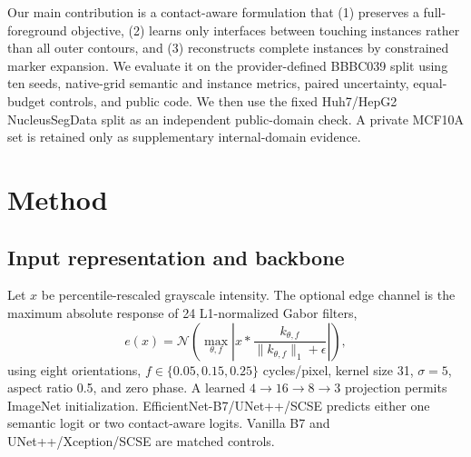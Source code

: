 \documentclass{article}
\begin{document}
Our main contribution is a contact-aware formulation that (1) preserves a full-foreground objective, (2) learns only interfaces between touching instances rather than all outer contours, and (3) reconstructs complete instances by constrained marker expansion. We evaluate it on the provider-defined BBBC039 split using ten seeds, native-grid semantic and instance metrics, paired uncertainty, equal-budget controls, and public code. We then use the fixed Huh7/HepG2 NucleusSegData split as an independent public-domain check. A private MCF10A set is retained only as supplementary internal-domain evidence.

\section{Method}
\subsection{Input representation and backbone}
Let $x$ be percentile-rescaled grayscale intensity. The optional edge channel is the maximum absolute response of 24 L1-normalized Gabor filters,
\begin{equation}
e(x)=\mathcal N\!\left(\max_{\theta,f}\left|x*\frac{k_{\theta,f}}{\lVert k_{\theta,f}\rVert_1+\epsilon}\right|\right),
\end{equation}
using eight orientations, $f\in\{0.05,0.15,0.25\}$ cycles/pixel, kernel size 31, $\sigma=5$, aspect ratio 0.5, and zero phase. A learned $4\!\rightarrow\!16\!\rightarrow\!8\!\rightarrow\!3$ projection permits ImageNet initialization. EfficientNet-B7/UNet++/SCSE predicts either one semantic logit or two contact-aware logits. Vanilla B7 and UNet++/Xception/SCSE are matched controls.
\end{document}

